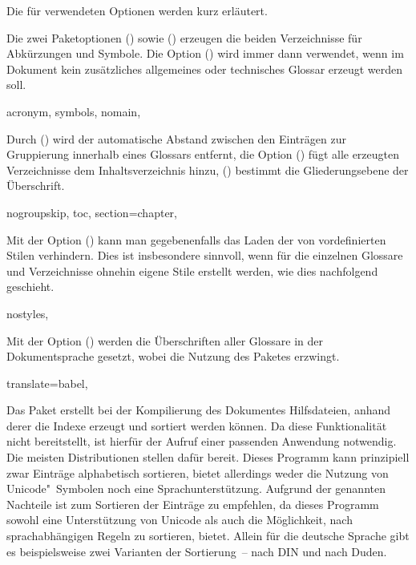 \documentclass[%
  english,ngerman,%
  cdgeometry=no,DIV=12,%
  automark,%
  listof=toc,%
]{tudscrartcl}
\begin{document}
Die für  verwendeten Optionen werden kurz erläutert.
%
\begin{Preamble+}
\AfterPackage*{hyperref}{%
\end{Preamble+}
\begin{Preamble}
\usepackage[%
\end{Preamble}
%
Die zwei Paketoptionen () sowie 
() erzeugen die beiden Verzeichnisse für 
Abkürzungen und Symbole. Die Option () wird 
immer dann verwendet, wenn im Dokument kein zusätzliches allgemeines oder 
technisches Glossar erzeugt werden soll.
%
\begin{Preamble}
  acronym,%
  symbols,%
  nomain,%
\end{Preamble}
%
Durch () wird der automatische Abstand 
zwischen den Einträgen zur Gruppierung innerhalb eines Glossars entfernt, die 
Option () fügt alle erzeugten Verzeichnisse 
dem Inhaltsverzeichnis hinzu, () bestimmt 
die Gliederungsebene der Überschrift.
%
\begin{Preamble}
  nogroupskip,%
  toc,%
  section=chapter,%
\end{Preamble}
%
Mit der Option () kann man gegebenenfalls 
das Laden der von  vordefinierten Stilen verhindern. Dies 
ist insbesondere sinnvoll, wenn für die einzelnen Glossare und Verzeichnisse 
ohnehin eigene Stile erstellt werden, wie dies nachfolgend geschieht.
%
\begin{Preamble}
  nostyles,%
\end{Preamble}
%
Mit der Option () werden die Überschriften
aller Glossare in der Dokumentsprache gesetzt, wobei  
die Nutzung des Paketes  erzwingt. 
%
\begin{Preamble}
  translate=babel,%
\end{Preamble}
%
Das Paket  erstellt bei der Kompilierung des Dokumentes 
Hilfsdateien, anhand derer die Indexe erzeugt und sortiert werden können. Da 
 diese Funktionalität nicht bereitstellt, ist hierfür der 
Aufruf einer passenden Anwendung notwendig. Die meisten Distributionen stellen
dafür  bereit. Dieses Programm kann prinzipiell zwar 
Einträge alphabetisch sortieren, bietet allerdings weder die Nutzung von 
Unicode"~Symbolen noch eine Sprachunterstützung. Aufgrund der genannten 
Nachteile ist  zum Sortieren der Einträge zu empfehlen, da 
dieses Programm sowohl eine Unterstützung von Unicode als auch die Möglichkeit, 
nach sprachabhängigen Regeln zu sortieren, bietet. Allein für die deutsche 
Sprache gibt es beispielsweise zwei Varianten der Sortierung~-- nach DIN und 
nach Duden. 
\end{document}
